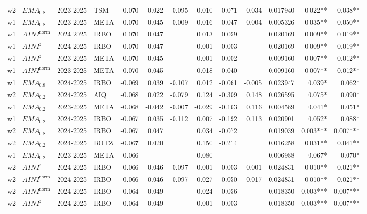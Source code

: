 \begin{longtable}{@{}llllrrrrrrrrr@{}}
w2 & $EMA_{0.8}$ & 2023-2025 & TSM & -0.070 & 0.022 & -0.095 & -0.010 & -0.071 & 0.034 & 0.017940 & 0.022** & 0.038** \\
w1 & $EMA_{0.8}$ & 2023-2025 & META & -0.070 & -0.045 & -0.009 & -0.016 & -0.047 & -0.004 & 0.005326 & 0.035** & 0.050** \\
w1 & $AINI^{\mathrm{norm}}$ & 2024-2025 & IRBO & -0.070 & 0.047 &  & 0.013 & -0.059 &  & 0.020169 & 0.009** & 0.019** \\
w1 & $AINI^{z}$ & 2024-2025 & IRBO & -0.070 & 0.047 &  & 0.001 & -0.003 &  & 0.020169 & 0.009** & 0.019** \\
w1 & $AINI^{z}$ & 2023-2025 & META & -0.070 & -0.045 &  & -0.001 & -0.002 &  & 0.009160 & 0.007** & 0.012** \\
w1 & $AINI^{\mathrm{norm}}$ & 2023-2025 & META & -0.070 & -0.045 &  & -0.018 & -0.040 &  & 0.009160 & 0.007** & 0.012** \\
w1 & $EMA_{0.8}$ & 2024-2025 & IRBO & -0.069 & 0.039 & -0.107 & 0.012 & -0.061 & -0.005 & 0.023947 & 0.039* & 0.062* \\
w2 & $EMA_{0.2}$ & 2024-2025 & AIQ & -0.068 & 0.022 & -0.079 & 0.124 & -0.309 & 0.148 & 0.026595 & 0.075* & 0.090* \\
w1 & $EMA_{0.2}$ & 2023-2025 & META & -0.068 & -0.042 & -0.007 & -0.029 & -0.163 & 0.116 & 0.004589 & 0.041* & 0.051* \\
w1 & $EMA_{0.2}$ & 2024-2025 & IRBO & -0.067 & 0.035 & -0.112 & 0.007 & -0.192 & 0.113 & 0.020901 & 0.052* & 0.088* \\
w2 & $EMA_{0.8}$ & 2024-2025 & IRBO & -0.067 & 0.047 &  & 0.034 & -0.072 &  & 0.019039 & 0.003*** & 0.007*** \\
w2 & $EMA_{0.2}$ & 2024-2025 & BOTZ & -0.067 & 0.020 &  & 0.150 & -0.214 &  & 0.016258 & 0.031** & 0.041** \\
w1 & $EMA_{0.2}$ & 2023-2025 & META & -0.066 &  &  & -0.080 &  &  & 0.006988 & 0.067* & 0.070* \\
w2 & $AINI^{z}$ & 2024-2025 & IRBO & -0.066 & 0.046 & -0.097 & 0.001 & -0.003 & -0.001 & 0.024831 & 0.010** & 0.021** \\
w2 & $AINI^{\mathrm{norm}}$ & 2024-2025 & IRBO & -0.066 & 0.046 & -0.097 & 0.027 & -0.050 & -0.017 & 0.024831 & 0.010** & 0.021** \\
w2 & $AINI^{\mathrm{norm}}$ & 2024-2025 & IRBO & -0.064 & 0.049 &  & 0.024 & -0.056 &  & 0.018350 & 0.003*** & 0.007*** \\
w2 & $AINI^{z}$ & 2024-2025 & IRBO & -0.064 & 0.049 &  & 0.001 & -0.003 &  & 0.018350 & 0.003*** & 0.007*** \\

\end{longtable}
